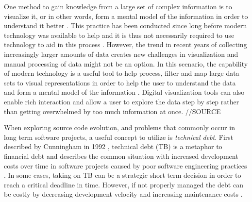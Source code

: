 One method to gain knowledge from a large set of complex information is to visualize it, or in other words, form a mental model of the information in order to understand it better \cite{spence_information_2014}. 
This practice has been conducted since long before modern technology was available to help and it is thus not necessarily required to use technology to aid in this process \cite{friendly_brief_2008}. 
However, the trend in recent years of collecting increasingly larger amounts of data creates new challenges in visualization and manual processing of data might not be an option. 
In this scenario, the capability of modern technology is a useful tool to help process, filter and map large data sets to visual representations in order to help the user to understand the data and form a mental model of the information \cite{card_structure_1997}. 
Digital visualization tools can also enable rich interaction and allow a user to explore the data step by step rather than getting overwhelmed by too much information at once. //SOURCE

When exploring source code evolution, and problems that commonly occur in long term software projects, a useful concept to utilize is \textit{technical debt}.
First described by Cunningham in 1992 \cite{cunningham_wycash_1992}, technical debt (TB) is a metaphor to financial debt and describes the common situation with increased development costs over time in software projects caused by poor software engineering practices \cite{tom_exploration_2013}.
In some cases, taking on TB can be a strategic short term decision in order to reach a critical deadline in time.
However, if not properly managed the debt can be costly by decreasing development velocity and increasing maintenance costs \cite{seaman_using_2012}.
